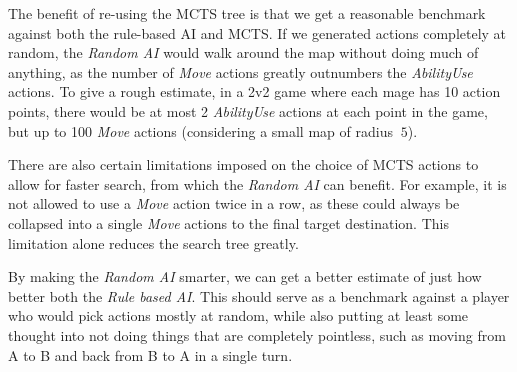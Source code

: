 The benefit of re-using the MCTS tree is that we get a reasonable benchmark against
both the rule-based AI and MCTS\@. If we generated actions completely at random, the \emph{Random AI}
would walk around the map without doing much of anything, as the number of \emph{Move} actions
greatly outnumbers the \emph{AbilityUse} actions. To give a rough estimate, in a 2v2 game where
each mage has 10 action points, there would be at most 2 \emph{AbilityUse} actions at each point
in the game, but up to 100 \emph{Move} actions (considering a small map of radius $~5$).

There are also certain limitations imposed on the choice of MCTS actions to allow for faster search,
from which the \emph{Random AI} can benefit. For example, it is not allowed to use a \emph{Move}
action twice in a row, as these could always be collapsed into a single \emph{Move} actions to the
final target destination. This limitation alone reduces the search tree greatly.

By making the \emph{Random AI} smarter, we can get a better estimate of just how better
both the \emph{Rule based AI}. This should serve as a benchmark against a player who would
pick actions mostly at random, while also putting at least some thought into not doing things
that are completely pointless, such as moving from A to B and back from B to A in a single turn.
